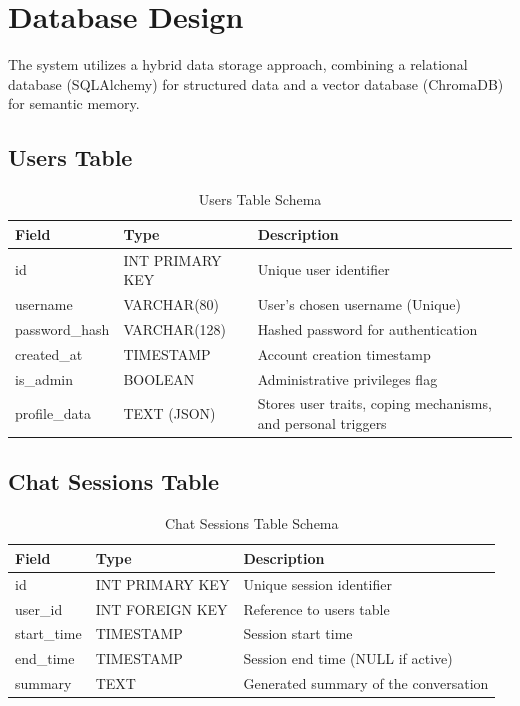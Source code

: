 \documentclass[11pt]{report}
\begin{document}
\section{Database Design}

The system utilizes a hybrid data storage approach, combining a relational database (SQLAlchemy) for structured data and a vector database (ChromaDB) for semantic memory.

\subsection{Users Table}
\begin{table}[H]
\centering
\caption{Users Table Schema}
\label{tab:users_table}
\begin{tabular}{|p{3cm}|p{3cm}|p{9cm}|}
\hline
Field & Type & Description \\ \hline
id & INT PRIMARY KEY & Unique user identifier \\ 
username & VARCHAR(80) & User's chosen username (Unique) \\ 
password\_hash & VARCHAR(128) & Hashed password for authentication \\ 
created\_at & TIMESTAMP & Account creation timestamp \\ 
is\_admin & BOOLEAN & Administrative privileges flag \\ 
profile\_data & TEXT (JSON) & Stores user traits, coping mechanisms, and personal triggers \\ 
\hline
\end{tabular}
\end{table}

\subsection{Chat Sessions Table}
\begin{table}[H]
\centering
\caption{Chat Sessions Table Schema}
\label{tab:sessions_table}
\begin{tabular}{|p{3cm}|p{3cm}|p{9cm}|}
\hline
Field & Type & Description \\ \hline
id & INT PRIMARY KEY & Unique session identifier \\ 
user\_id & INT FOREIGN KEY & Reference to users table \\ 
start\_time & TIMESTAMP & Session start time \\ 
end\_time & TIMESTAMP & Session end time (NULL if active) \\ 
summary & TEXT & Generated summary of the conversation \\ 
\hline
\end{tabular}
\end{table}
\end{document}
